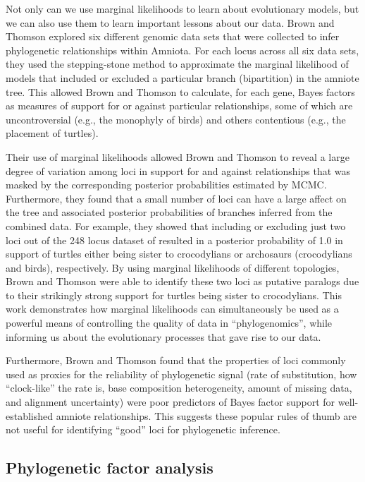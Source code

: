 Not only can we use marginal likelihoods to learn about evolutionary models,
but we can also use them to learn important lessons about our data.
Brown and Thomson \citeyear{Brown2017} explored six different genomic data sets
that were collected to infer phylogenetic relationships within Amniota.
For each locus across all six data sets, they used the stepping-stone method
\citep{Xie2011} to approximate the marginal likelihood of models that included
or excluded a particular branch (bipartition) in the amniote tree.
This allowed Brown and Thomson \citeyear{Brown2017} to calculate, for each
gene, Bayes factors as measures of support for or against particular
relationships, some of which are uncontroversial (e.g., the monophyly of birds)
and others contentious (e.g., the placement of turtles).

Their use of marginal likelihoods allowed Brown and Thomson
\citeyear{Brown2017} to reveal a large degree of variation among loci in
support for and against relationships that was masked by the corresponding
posterior probabilities estimated by MCMC.
Furthermore, they found that a small number of loci can have a large affect on
the tree and associated posterior probabilities of branches inferred from the
combined data.
For example, they showed that including or excluding just two loci out of the
248 locus dataset of \citep{Chiari2012} resulted in a posterior probability of
1.0 in support of turtles either being sister to crocodylians or archosaurs
(crocodylians and birds), respectively.
By using marginal likelihoods of different topologies, Brown and Thomson
\citeyear{Brown2017} were able to identify these two loci as putative paralogs
due to their strikingly strong support for turtles being sister to
crocodylians.
This work demonstrates how marginal likelihoods can simultaneously be used as a
powerful means of controlling the quality of data in ``phylogenomics'', while
informing us about the evolutionary processes that gave rise to our data.

Furthermore, Brown and Thomson \citeyear{Brown2017} found that the properties
of loci commonly used as proxies for the reliability of phylogenetic signal
(rate of substitution, how ``clock-like'' the rate is, base composition
heterogeneity, amount of missing data, and alignment uncertainty) were poor
predictors of Bayes factor support for well-established amniote relationships.
This suggests these popular rules of thumb are not useful for identifying
``good'' loci for phylogenetic inference.


\subsection{Phylogenetic factor analysis}

